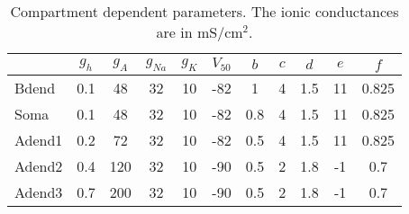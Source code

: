 \begin{table}[htbp]
    \centering
    \caption[Compartment dependent parameters]{Compartment dependent parameters. The ionic conductances are in mS/cm\(^2\).}
    \begin{tabular}{l|cccccccccc}
        \hline
        \hline
               & \( g_{h} \) & \( g_{A} \) & \( g_{Na} \) & \( g_{K} \) & \( V_{50} \) & \( b \) & \( c \) & \( d \) & \( e \) & \( f \) \\
        \hline
        Bdend  & 0.1         & 48          & 32           & 10          & -82          & 1       & 4       & 1.5     & 11      & 0.825   \\
        Soma   & 0.1         & 48          & 32           & 10          & -82          & 0.8     & 4       & 1.5     & 11      & 0.825   \\
        Adend1 & 0.2         & 72          & 32           & 10          & -82          & 0.5     & 4       & 1.5     & 11      & 0.825   \\
        Adend2 & 0.4         & 120         & 32           & 10          & -90          & 0.5     & 2       & 1.8     & -1      & 0.7     \\
        Adend3 & 0.7         & 200         & 32           & 10          & -90          & 0.5     & 2       & 1.8     & -1      & 0.7     \\
        \hline
        \hline
    \end{tabular}
\end{table}\label{table:compartment_dependent_parameters}

